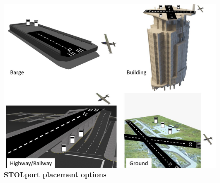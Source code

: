 \documentclass[]{aiaa-tc}%
\begin{document}
\begin{figure}[h!]
	\begin{center}
	\includegraphics[width=1.0\textwidth]{3 STOLport Visualizations.pdf}
    \caption{\textbf{STOLport placement options}}
	\label{f:svis}
	\end{center}
\end{figure}
\end{document}
